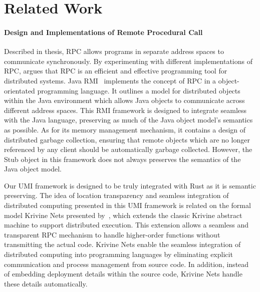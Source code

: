 \section{Related Work}
\label{chap3:related-work}
\paragraph*{Design and Implementations of Remote Procedural Call}
Described in  thesis, RPC allows programs in separate address spaces to communicate synchronously. By experimenting with different implementations of RPC, \citet{10.5555/910306} argues that RPC is an efficient and effective programming tool for distributed systems. Java RMI~\citep{10.5555/1268049.1268066} implements the concept of RPC in a object-orientated programming language. It outlines a model for distributed objects within the Java environment which allows Java objects to communicate across different address spaces. This RMI framework is designed to integrate seamless with the Java language, preserving as much of the Java object model's semantics as possible. As for its memory management mechanism, it contains a design of distributed garbage collection, ensuring that remote objects which are no longer referenced by any client should be automatically garbage collected. However, the Stub object in this framework does not always preserves the semantics of the Java object model. 

Our UMI framework is designed to be truly integrated with Rust as it is semantic preserving. The idea of location transparency and seamless integration of distributed computing presented in this UMI framework is related on the formal model Krivine Nets presented by~\citet{10.1145/2628136.2628152}, which extends the classic Krivine abstract machine to support distributed execution. This extension allows a seamless and transparent RPC mechanism to handle higher-order functions without transmitting the actual code. Krivine Nets enable the seamless integration of distributed computing into programming languages by eliminating explicit communication and process management from source code. In addition, instead of embedding deployment details within the source code, Krivine Nets handle these details automatically. 

